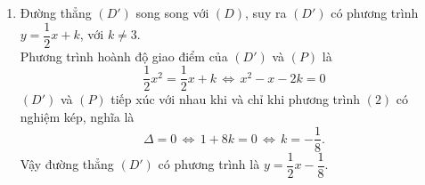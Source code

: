\begin{ex}
{\begin{enumerate}
{\begin{tikzpicture}[>=stealth,x=1cm,y=1cm,scale=0.8]
			\end{tikzpicture}		
	 	}
		$\bullet\;$ Tìm tọa độ giao điểm của $(P)$ và $(D)$ bằng phép toán.\\
			Phương trình hoành độ giao điểm của $(D)$ và $(P)$ là
			\[\dfrac{1}{2}x^2=\dfrac{1}{2}x+3 \,\Leftrightarrow\, x^2-x-6=0 \tag{1}\]
			Phương trình $(1)$ có $\Delta=(-1)^2-4\cdot 1\cdot(-6)=25>0$.\\
			Suy ra phương trình $(1)$ có hai nghiệm phân biệt $\left[ \begin{aligned} &x=-2 \\&x=3. \end{aligned}\right.$\\
			Ta có $x=-2 \,\Rightarrow\, y=2$; $x=3 \Rightarrow y=\dfrac{9}{2}$.\\
			Vậy $(D)$ và $(P)$ cắt nhau tại hai điểm có tọa độ là $\left(-2;2\right)$ và $\left(3;\dfrac{9}{2}\right)$.
		\item Đường thẳng $(D')$ song song với $(D)$, suy ra $(D')$ có phương trình $y=\dfrac{1}{2}x+k$, với $k\neq 3$.\\
		Phương trình hoành độ giao điểm của $(D')$ và $(P)$ là
		\[\dfrac{1}{2}x^2=\dfrac{1}{2}x+k \,\Leftrightarrow\, x^2-x-2k=0 \tag{2}\]
		$(D')$ và $(P)$ tiếp xúc với nhau khi và chỉ khi phương trình $(2)$ có nghiệm kép, nghĩa là
		\[\Delta =0 \,\Leftrightarrow\, 1+8k=0 \,\Leftrightarrow\, k=-\dfrac{1}{8}.\]
		Vậy đường thẳng $(D')$ có phương trình là $y=\dfrac{1}{2}x-\dfrac{1}{8}$.
	\end{enumerate}
}
\end{ex}
